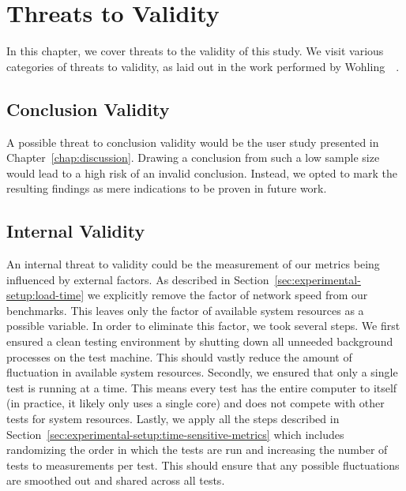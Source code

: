\chapter{Threats to Validity}\label{chap:threats-to-validity}

In this chapter, we cover threats to the validity of this study. We visit various categories of threats to validity, as laid out in the work performed by Wohling~\etal{}~\cite{alma9939160411205131}.

\section{Conclusion Validity}
A possible threat to conclusion validity would be the user study presented in Chapter~\ref{chap:discussion}. Drawing a conclusion from such a low sample size would lead to a high risk of an invalid conclusion. Instead, we opted to mark the resulting findings as mere indications to be proven in future work.

\section{Internal Validity}
An internal threat to validity could be the measurement of our metrics being influenced by external factors. As described in Section~\ref{sec:experimental-setup:load-time} we explicitly remove the factor of network speed from our benchmarks. This leaves only the factor of available system resources as a possible variable. In order to eliminate this factor, we took several steps. We first ensured a clean testing environment by shutting down all unneeded background processes on the test machine. This should vastly reduce the amount of fluctuation in available system resources. Secondly, we ensured that only a single test is running at a time. This means every test has the entire computer to itself (in practice, it likely only uses a single core) and does not compete with other tests for system resources. Lastly, we apply all the steps described in Section~\ref{sec:experimental-setup:time-sensitive-metrics} which includes randomizing the order in which the tests are run and increasing the number of tests to \numMeasures{} measurements per test. This should ensure that any possible fluctuations are smoothed out and shared across all tests.

